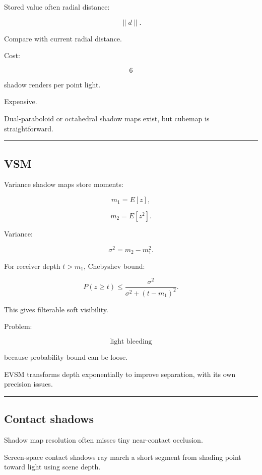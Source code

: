 Stored value often radial distance:

\[
\|d\|.
\]

Compare with current radial distance.

Cost:

\[
6
\]

shadow renders per point light.

Expensive.

Dual-paraboloid or octahedral shadow maps exist, but cubemap is straightforward.

\begin{center}\rule{0.5\linewidth}{0.5pt}\end{center}

\subsection{VSM}\label{04-visual-computing-ii-ch040-vsm}

Variance shadow maps store moments:

\[
m_1=E[z],
\]

\[
m_2=E[z^2].
\]

Variance:

\[
\sigma^2=
m_2-m_1^2.
\]

For receiver depth \(t>m_1\), Chebyshev bound:

\[
\boxed{
P(z\ge t)
\le
\frac{
\sigma^2
}{
\sigma^2+(t-m_1)^2
}.
}
\]

This gives filterable soft visibility.

Problem:

\[
\boxed{\text{light bleeding}}
\]

because probability bound can be loose.

EVSM transforms depth exponentially to improve separation, with its own precision issues.

\begin{center}\rule{0.5\linewidth}{0.5pt}\end{center}

\subsection{Contact shadows}\label{04-visual-computing-ii-ch040-contact-shadows}

Shadow map resolution often misses tiny near-contact occlusion.

Screen-space contact shadows ray march a short segment from shading point toward light using scene depth.

